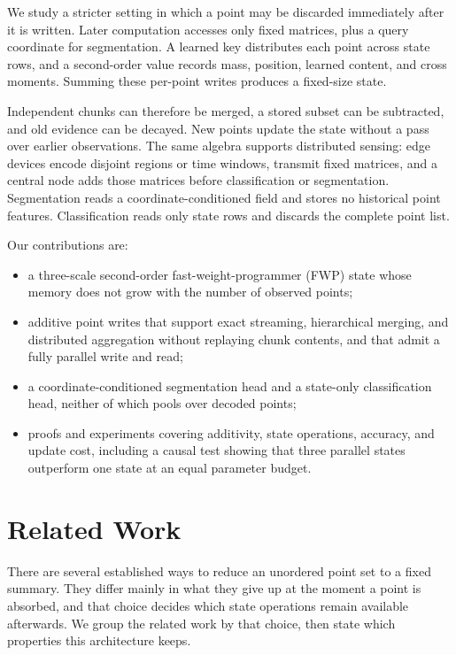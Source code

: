 \documentclass[11pt,a4paper]{article}
\begin{document}
We study a stricter setting in which a point may be discarded immediately after it is written. Later computation accesses only fixed matrices, plus a query coordinate for segmentation. A learned key distributes each point across state rows, and a second-order value records mass, position, learned content, and cross moments. Summing these per-point writes produces a fixed-size state.

Independent chunks can therefore be merged, a stored subset can be subtracted, and old evidence can be decayed. New points update the state without a pass over earlier observations. The same algebra supports distributed sensing: edge devices encode disjoint regions or time windows, transmit fixed matrices, and a central node adds those matrices before classification or segmentation. Segmentation reads a coordinate-conditioned field and stores no historical point features. Classification reads only state rows and discards the complete point list.

Our contributions are:
\begin{itemize}
\item a three-scale second-order fast-weight-programmer (FWP) state whose memory does not grow with the number of observed points;
\item additive point writes that support exact streaming, hierarchical merging, and distributed aggregation without replaying chunk contents, and that admit a fully parallel write and read;
\item a coordinate-conditioned segmentation head and a state-only classification head, neither of which pools over decoded points;
\item proofs and experiments covering additivity, state operations, accuracy, and update cost, including a causal test showing that three parallel states outperform one state at an equal parameter budget.
\end{itemize}

\section{Related Work}
There are several established ways to reduce an unordered point set to a fixed summary. They differ mainly in what they give up at the moment a point is absorbed, and that choice decides which state operations remain available afterwards. We group the related work by that choice, then state which properties this architecture keeps.
\end{document}
